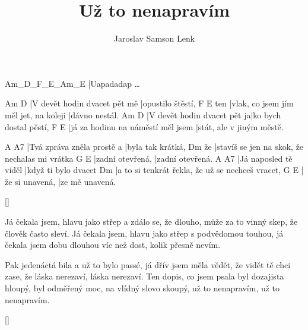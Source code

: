 \documentclass{song}
\author{Jaroslav Samson Lenk}
\title{Už to nenapravím}
\begin{document}
Am_D_F_E_Am_E
|Uapadadap \ldots
\endstrophe

\strophe
Am                           D
|V devět hodin dvacet pět mě |opustilo štěstí,
    F                                     E
ten |vlak, co jsem jím měl jet, na koleji |dávno nestál.
Am                          D
|V devět hodin dvacet pět ja|ko bych dostal pěstí,
F                                 E
|já za hodinu na náměstí měl jsem |stát, ale v jiným městě.
\endstrophe

\strophe
A                          A7
|Tvá zpráva zněla prostě a |byla tak krátká,
   Dm
že |stavíš se jen na skok, že nechalas mi vrátka
G                E
|zadní otevřená, |zadní otevřená.
A                     A7
|Já naposled tě viděl |když ti bylo dvacet
Dm
|a to si tenkrát řekla, že už se nechceš vracet,
G               E
|že si unavená, |ze mě unavená.
\endstrophe

\ref{}

\strophe*
Já čekala jsem, hlavu jako střep a zdálo se, že dlouho,
může za to vinný skep, že člověk často sleví.
Já čekala jsem, hlavu jako střep s podvědomou touhou,
já čekala jsem dobu dlouhou víc než dost, kolik přesně nevím.
\endstrophe

\strophe*
Pak jedenáctá bila a už to bylo passé,
já dřív jsem měla vědět, že vidět tě chci zase,
že láska nerezaví, láska nerezaví.
Ten dopis, co jsem psala byl dozajista hloupý,
byl odměřený moc, na vlídný slovo skoupý,
už to nenapravím, už to nenapravím.
\endstrophe

\ref{}
\end{document}
